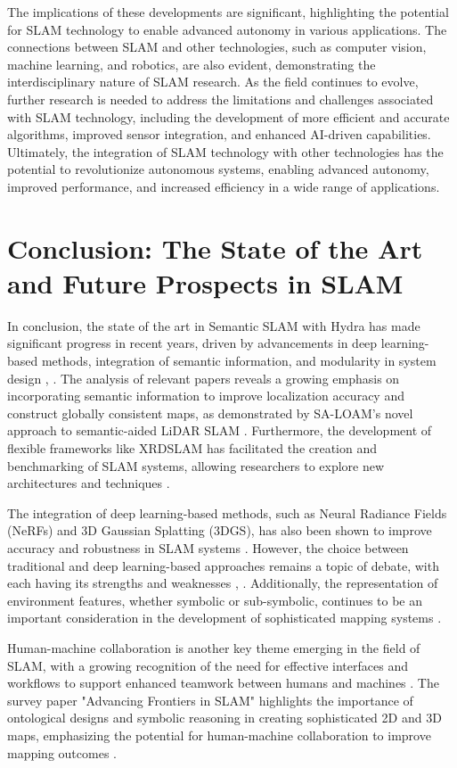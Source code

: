 \documentclass[conference]{IEEEtran}
\begin{document}
The implications of these developments are significant, highlighting the potential for SLAM technology to enable advanced autonomy in various applications. The connections between SLAM and other technologies, such as computer vision, machine learning, and robotics, are also evident, demonstrating the interdisciplinary nature of SLAM research. As the field continues to evolve, further research is needed to address the limitations and challenges associated with SLAM technology, including the development of more efficient and accurate algorithms, improved sensor integration, and enhanced AI-driven capabilities. Ultimately, the integration of SLAM technology with other technologies has the potential to revolutionize autonomous systems, enabling advanced autonomy, improved performance, and increased efficiency in a wide range of applications.

\section{Conclusion: The State of the Art and Future Prospects in SLAM}
In conclusion, the state of the art in Semantic SLAM with Hydra has made significant progress in recent years, driven by advancements in deep learning-based methods, integration of semantic information, and modularity in system design \cite{b1}, \cite{b3}. The analysis of relevant papers reveals a growing emphasis on incorporating semantic information to improve localization accuracy and construct globally consistent maps, as demonstrated by SA-LOAM's novel approach to semantic-aided LiDAR SLAM \cite{b2}. Furthermore, the development of flexible frameworks like XRDSLAM has facilitated the creation and benchmarking of SLAM systems, allowing researchers to explore new architectures and techniques \cite{b4}.

The integration of deep learning-based methods, such as Neural Radiance Fields (NeRFs) and 3D Gaussian Splatting (3DGS), has also been shown to improve accuracy and robustness in SLAM systems \cite{b5}. However, the choice between traditional and deep learning-based approaches remains a topic of debate, with each having its strengths and weaknesses \cite{b1}, \cite{b3}. Additionally, the representation of environment features, whether symbolic or sub-symbolic, continues to be an important consideration in the development of sophisticated mapping systems \cite{b1}.

Human-machine collaboration is another key theme emerging in the field of SLAM, with a growing recognition of the need for effective interfaces and workflows to support enhanced teamwork between humans and machines \cite{b1}. The survey paper "Advancing Frontiers in SLAM" highlights the importance of ontological designs and symbolic reasoning in creating sophisticated 2D and 3D maps, emphasizing the potential for human-machine collaboration to improve mapping outcomes \cite{b1}.
\end{document}
